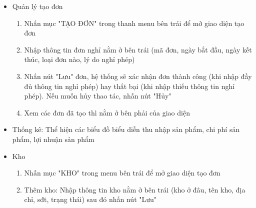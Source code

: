 \documentclass[a4paper,12pt]{report}
\begin{document}
\begin{itemize}
\begin{itemize}
\begin{enumerate}[label=B\arabic*:]
                        \begin{itemize}
                            \item Thêm chấm công: Khi nhấn nút icon "Thêm" sẽ hiện giao diện nhập các thông tin chấm công (ngày, tháng, năm, nghỉ, tăng ca, xóa, ... sau đó nhấn nút "Thêm")
                            \item Sửa chấm công: Nhấn chọn 1 dòng trong bảng danh sách chấm~công để sửa thông tin cần sửa
                            \item Xóa chấm công: Chọn 1 dòng trong danh sách chấm công để xóa. Hệ thống sẽ xác nhận lại có xóa không, sau đó sẽ thực hiện xóa
                            \item Xuất file Excel: Khi nhấn nút icon "Excel" thì hệ thống sẽ xuất file excel cho người dùng
                            \item In file: Khi nhấn nút icon "In" thì hệ thống sẽ in file pdf cho người~dùng
                        \end{itemize}
                    \end{enumerate}
              \item Quản lý tạo đơn
                    \begin{enumerate}[label=B\arabic*:]
                        \item Nhấn mục "TẠO ĐƠN" trong thanh menu bên trái để mở giao diện tạo đơn
                        \item Nhập thông tin đơn nghỉ nằm ở bên trái (mã đơn, ngày bắt đầu, ngày kết thúc, loại đơn nào, lý do nghỉ phép)
                        \item Nhấn nút "Lưu" đơn, hệ thống sẽ xác nhận đơn thành công (khi nhập đầy đủ thông tin nghỉ phép) hay thất bại (khi nhập thiếu thông tin nghỉ phép). Nếu muốn hủy thao tác, nhấn nút "Hủy"
                        \item Xem các đơn đã tạo thì nằm ở bên phải của giao diện
                    \end{enumerate}
              \item Thống kê: Thể hiện các biểu đồ biểu diễn thu nhập sản phẩm, chi phí sản phẩm, lợi nhuận sản phẩm
              \item Kho
                \begin{enumerate}[label=B\arabic*:]
                    \item Nhấn mục "KHO" trong menu bên trái để mở giao diện tạo đơn
                    \item Thêm kho: Nhập thông tin kho nằm ở bên trái (kho ở đâu, tên kho, địa chỉ, sđt, trạng thái) sau đó nhấn nút "Lưu"

\end{enumerate}
\end{itemize}
\end{itemize}
\end{document}
